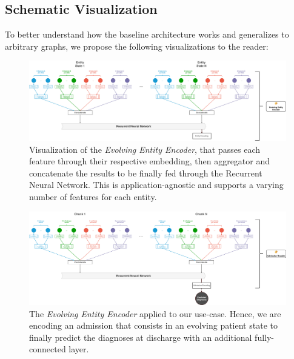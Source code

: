 \newpage
\begin{landscape}
 \section{Schematic Visualization}
 To better understand how the baseline architecture works and generalizes to arbitrary graphs, we propose the following visualizations to the reader: \\
 
 \begin{figure}[H]
  \centering
  \includegraphics[width=\linewidth]{figures/encoder-general.pdf}
  
  \caption{Visualization of the \emph{Evolving Entity Encoder}, that passes each feature through their respective embedding, then aggregator and concatenate the results to be finally fed through the Recurrent Neural Network. This is application-agnostic and supports a varying number of features for each entity.}
 \end{figure}
\end{landscape}
\newpage
\begin{landscape}
\begin{figure}[H]
 \centering
 \includegraphics[width=\linewidth]{figures/encoder-healthcare.pdf}
 
 \caption{The \emph{Evolving Entity Encoder} applied to our use-case. Hence, we are encoding an admission that consists in an evolving patient state to finally predict the diagnoses at discharge with an additional fully-connected layer.}
\end{figure}
\end{landscape}